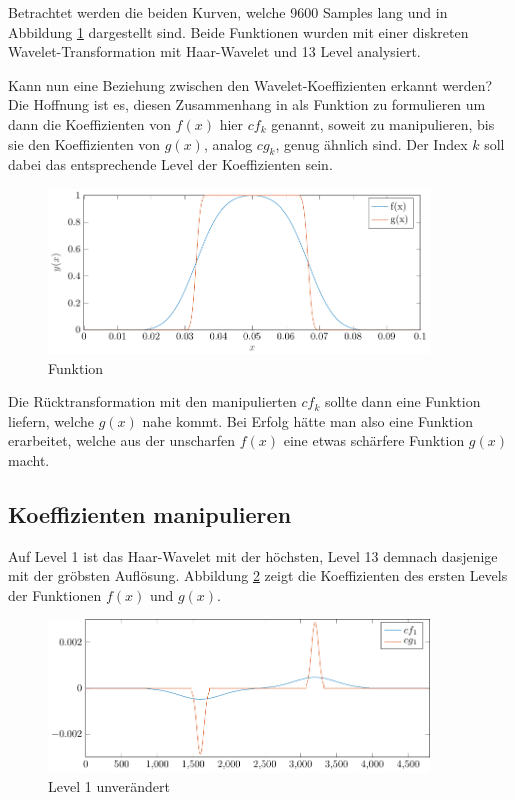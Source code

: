 Betrachtet werden die beiden Kurven, welche 9600 Samples lang und in Abbildung \ref{deconvolve:1d} dargestellt sind.
Beide Funktionen wurden mit einer diskreten Wavelet-Transformation mit Haar-Wavelet und 13 Level analysiert.


Kann nun eine Beziehung zwischen den Wavelet-Koeffizienten erkannt werden?
Die Hoffnung ist es, diesen Zusammenhang in als Funktion zu formulieren um dann die Koeffizienten von $f(x)$ hier $cf_k$ genannt, soweit zu manipulieren, bis sie den Koeffizienten von $g(x)$, analog $cg_k$, genug ähnlich sind.
Der Index $k$ soll dabei das entsprechende Level der Koeffizienten sein.
\begin{figure}[h]
\centering
\includegraphics[width=0.9\textwidth]{./papers/deconvolve/pictures/1d.pdf}
\caption{Funktion\label{deconvolve:1d}}
\end{figure}
Die Rücktransformation mit den manipulierten $cf_k$ sollte dann eine Funktion liefern, welche $g(x)$ nahe kommt.
Bei Erfolg hätte man also eine Funktion erarbeitet, welche aus der \glqq unscharfen\grqq{} $f(x)$ eine etwas \glqq schärfere\grqq{} Funktion $g(x)$ macht. 

\subsection{Koeffizienten manipulieren}
Auf Level 1 ist das Haar-Wavelet mit der höchsten, Level 13 demnach dasjenige mit der gröbsten Auflösung.
Abbildung \ref{deconvolve:level1} zeigt die Koeffizienten des ersten Levels der Funktionen $f(x)$ und $g(x)$.
\begin{figure}[h]
\centering
\includegraphics[width=0.9\textwidth]{./papers/deconvolve/pictures/level/level1.pdf}
\caption{Level 1 unverändert\label{deconvolve:level1}}
\end{figure}

